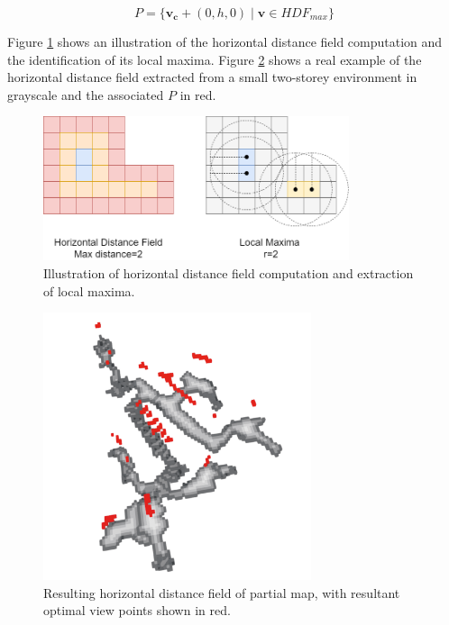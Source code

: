 \begin{equation}
    \label{eq:views}
P = \{\boldsymbol{v_c} + (0, h, 0) \mid \boldsymbol{v} \in HDF_{max}\}
\end{equation}

Figure \ref{fig:hdf_simple} shows an illustration of the horizontal distance field computation and the identification of its local maxima. Figure \ref{fig:hdf} shows a real example of the horizontal distance field extracted from a small two-storey environment in grayscale and the associated \(P\) in red.

\begin{figure}[h]
    \centering
    \includegraphics*[width=0.8\textwidth]{./fig/hdf_simple.png}
    \caption{Illustration of horizontal distance field computation and extraction of local maxima.}
    \label{fig:hdf_simple}
\end{figure}

\begin{figure}[h]
    \centering
    \includegraphics*[width=0.7\textwidth]{./fig/horizontal_distance_field.png}
    \caption{Resulting horizontal distance field of partial map, with resultant optimal view points shown in red.}
    \label{fig:hdf}
\end{figure}

